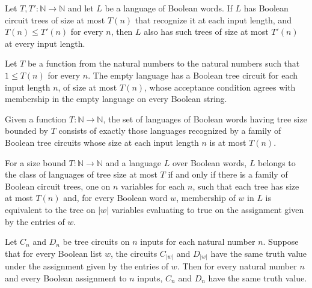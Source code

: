\begin{theorem}
\label{Language.InTreeSize.mono}
\leanok
{}
Let $T,T':\mathbb{N}\to\mathbb{N}$ and let $L$ be a language of Boolean words. If $L$
has Boolean circuit trees of size at most $T(n)$ that recognize it at each input length,
and $T(n)\le T'(n)$ for every $n$, then $L$ also has such trees of size at most $T'(n)$
at every input length.
\end{theorem}

\begin{theorem}
\label{Language.zero_inTreeSize}
\leanok
{}
Let $T$ be a function from the natural numbers to the natural numbers such that $1\le
T(n)$ for every $n$. The empty language has a Boolean tree circuit for each input length
$n$, of size at most $T(n)$, whose acceptance condition agrees with membership in the
empty language on every Boolean string.
\end{theorem}

\begin{definition}
\label{BoolCircuit.TreeSize}
\leanok
{}
Given a function $T:\mathbb{N}\to\mathbb{N}$, the set of languages of Boolean words
having tree size bounded by $T$ consists of exactly those languages recognized by a
family of Boolean tree circuits whose size at each input length $n$ is at most $T(n)$.
\end{definition}

\begin{theorem}
\label{BoolCircuit.mem_treeSize_iff}
\leanok
{}
For a size bound $T : \mathbb{N} \to \mathbb{N}$ and a language $L$ over Boolean words,
$L$ belongs to the class of languages of tree size at most $T$ if and only if there is a
family of Boolean circuit trees, one on $n$ variables for each $n$, such that each tree
has size at most $T(n)$ and, for every Boolean word $w$, membership of $w$ in $L$ is
equivalent to the tree on $|w|$ variables evaluating to true on the assignment given by
the entries of $w$.
\end{theorem}

\begin{theorem}
\label{BoolCircuit.eval_eq_of_iff}
\leanok
{}
Let $C_n$ and $D_n$ be tree circuits on $n$ inputs for each natural number $n$. Suppose
that for every Boolean list $w$, the circuits $C_{|w|}$ and $D_{|w|}$ have the same
truth value under the assignment given by the entries of $w$. Then for every natural
number $n$ and every Boolean assignment to $n$ inputs, $C_n$ and $D_n$ have the same
truth value.
\end{theorem}

